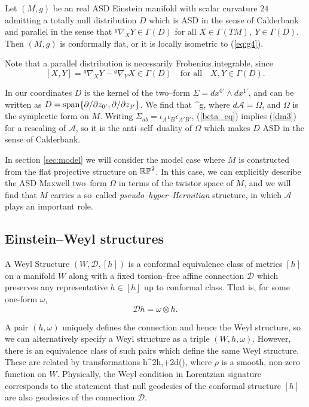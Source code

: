 \begin{theo}\cite{DM} \label{thm:DMcharacterisation}
Let $(M,g)$ be an real ASD Einstein manifold with scalar curvature $24$ admitting a totally null distribution $D$ which is ASD in the sense of Calderbank and parallel in the sense that $^g\nabla_XY\in\Gamma(D)$ for all $X\in \Gamma(TM),\ Y\in\Gamma(D)$. Then $(M,g)$ is conformally flat, or it is locally isometric to (\ref{eq:g4}).
\end{theo}
\noindent
Note that a parallel distribution is necessarily Frobenius integrable, since
\[
[X,Y]= {^g}\nabla_XY- {^g}\nabla_YX\in\Gamma(D)\quad\mbox{for all}\quad X,Y\in\Gamma(D).
\]

In our coordinates $D$ is the kernel of the two--form $\Sigma=dx^{0'}\wedge dx^{1'}$, and can be written as ${D}=\mathrm{span}\{\partial/\partial z_{0'},\partial/\partial z_{1'}\}$. We find that
\be
\label{beta_eq}
^g\nabla{}\otimes \Sigma,
\ee
where $d\mathcal{A}=\Omega$, and $\Omega$ is the symplectic form on $M$. Writing $\Sigma_{ab}=\iota_A\iota_B\epsilon_{A'B'}$, (\ref{beta_eq}) implies (\ref{dm3}) for a rescaling of $\mathcal{A}$, so it is the anti--self--duality of $\Omega$ which makes $D$ ASD in the sense of Calderbank. 

In section \ref{sec:model} we will consider the model case where $M$ is constructed from the flat projective structure on $\mathbb{RP}^2$. In this case, we can explicitly describe the ASD Maxwell two--form $\Omega$ in terms of the twistor space of $M$,
and we will find that $M$ carries a so--called \textit{pseudo--hyper--Hermitian} structure, in which $\mathcal{A}$ plays an important role.












\subsection{Einstein--Weyl structures}
\begin{defi}
A Weyl Structure $(W,\mathscr{D},[h])$ is a conformal equivalence class of metrics $[h]$ on a manifold $W$ along with a fixed torsion--free affine connection $\mathscr{D}$ which preserves any representative $h\in[h]$ up to conformal class. That is, for some one-form $\omega$,
\[
\mathscr{D}h=\omega\otimes h.
\]
\end{defi}
A pair $(h,\omega)$ uniquely defines the connection and hence the Weyl structure, so we can alternatively specify a Weyl structure as a triple $(W,h,\omega)$. However, there is an equivalence class of such pairs which define the same Weyl structure. These are related by transformations
\be
\label{weyl_tr}
h\rightarrow \rho^2h,\quad\omega\rightarrow\omega+2d(\rho),
\ee
where $\rho$ is a smooth, non-zero function on $W$. 
Physically, the Weyl condition in Lorentzian signature corresponds to the statement that null geodesics of the conformal structure $[h]$ are also geodesics of the connection $\mathscr{D}$.

